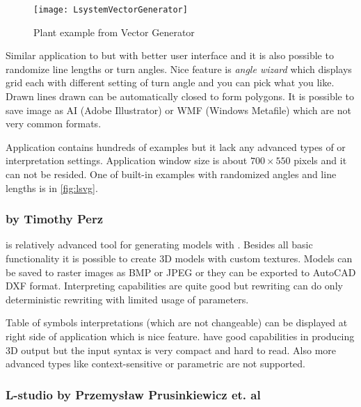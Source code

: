 \begin{wrapfigure}{r}{0.4\textwidth}
	\vspace{-20pt}
	\texttt{[image: LsystemVectorGenerator]}
	\caption{Plant example from \lsystem Vector Generator}
	\label{fig:lsvg}
\end{wrapfigure}

\noindent
Similar application to  but with better user interface and it is also possible to randomize line lengths or turn angles.
Nice feature is \emph{angle wizard} which displays grid \lsystems each with different setting of turn angle and you can pick what you like.
Drawn lines drawn can be automatically closed to form polygons.
It is possible to save image as AI (Adobe Illustrator) or WMF (Windows Metafile) which are not very common formats.

Application contains hundreds of examples but it lack any advanced types of \lsystems or interpretation settings.
Application window size is about $700 \times 550$ pixels and it can not be resided.
One of built-in examples with randomized angles and line lengths is in \autoref{fig:lsvg}.


\subsubsection{ by Timothy Perz}

\noindent
{} is relatively advanced tool for generating models with \lsystems.
Besides all basic functionality it is possible to create 3D models with custom textures.
Models can be saved to raster images as BMP or JPEG or they can be exported to AutoCAD DXF format.
Interpreting capabilities are quite good but \lsystem rewriting can do only deterministic rewriting with limited usage of parameters.

Table of symbols interpretations (which are not changeable) can be displayed at right side of application which is nice feature.
 have good capabilities in producing 3D output but the input syntax is very compact and hard to read.
Also more advanced \lsystem types like context-sensitive or parametric \lsystems are not supported.

\newcommand{\lstudio}{\mbox{L-studio}\xspace}

\subsubsection{\lstudio by Przemysław Prusinkiewicz et. al}

